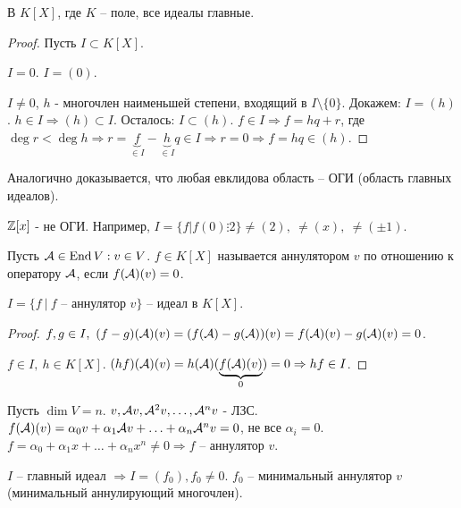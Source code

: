 \documentclass[main]{subfiles}
\begin{document}
\begin{corollary}
    В $K[X]$, где $K$ -- поле, все идеалы главные.
\end{corollary}

\begin{proof}
    Пусть $I \subset K[X]$.

    $I = 0$. $I = (0)$.

    $I \neq 0 $, $h$ - многочлен наименьшей степени, входящий в $I\setminus \{0\}$.
    Докажем: $I = (h)$. $h \in I \Rightarrow (h) \subset I$.
    Осталось: $I \subset (h)$. $f \in I \Rightarrow f=hq+r$, где $\deg r < \deg h
        \Rightarrow r = \underbrace{f}_{\in I} - \underbrace{h}_{\in I} q \in I \Rightarrow r = 0 \Rightarrow f = hq \in (h)$.
\end{proof}

\begin{remark}
    Аналогично доказывается, что любая евклидова область -- ОГИ (область главных идеалов).
\end{remark}

\begin{remark}
    $\mathbb{Z}[x]$ - не ОГИ. Например, $I = \{f|f(0) \vdots 2\} \neq (2),\ \neq (x),\ \neq (\pm 1)$.
\end{remark}

\begin{definition} [Аннулятор]
    Пусть $\mathcal{A} \in \operatorname{End} V : v\in V$. $f \in K[X]$ называется аннулятором $v$ по отношению к оператору $\mathcal{A}$, если $f(\mathcal{A})(v) = 0$.
\end{definition}

\begin{lemma}
    $I = \{f \ | \ f$ -- аннулятор $v \}$ -- идеал в $K[X]$.
\end{lemma}

\begin{proof}
    $f, g \in I,\ (f-g)(\mca)(v) = (f(\mca)-g(\mca))(v) = f(\mca)(v) - g(\mca)(v) = 0$.

    $f \in I,\ h \in K[X]$. $(hf)(\mathcal{A})(v) = h(\mathcal{A})(\underbrace{f(\mathcal{A})(v)}_{0}) = 0 \Rightarrow hf \in I$.
\end{proof}

Пусть $\dim V = n$. $v, \mathcal{A} v, {\mathcal{A}}^2 v, \ldots, {\mathcal{A}}^n v$ - ЛЗС.
$f(\mathcal{A})(v) = \alpha_0 v + \alpha_1 \mathcal{A} v + \ldots + \alpha_n {\mathcal{A}}^n v = 0$, не все $\alpha_i =0$.
$f = \alpha_0 + \alpha_1 x + \ldots + \alpha_n x^n \neq 0 \Rightarrow f$ -- аннулятор $v$.

$I$ -- главный идеал $\Rightarrow I=(f_0), f_0 \neq 0$. $f_0$ -- минимальный аннулятор $v$ (минимальный аннулирующий многочлен).
\end{document}
